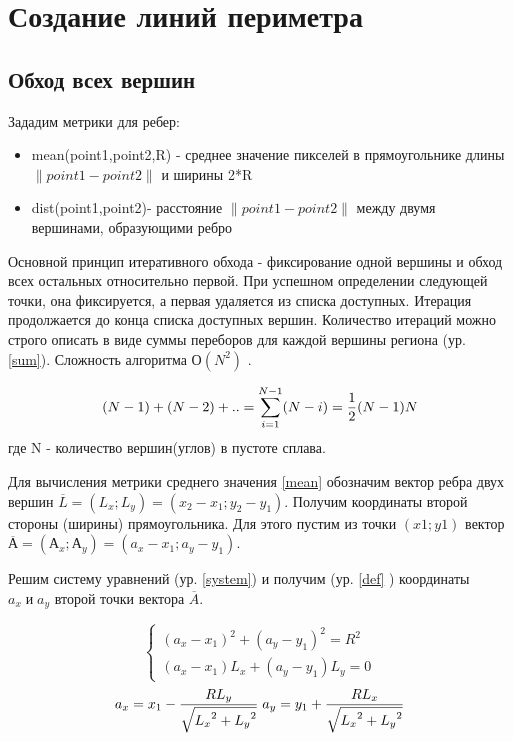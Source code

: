 \documentclass[a4paper, 14pt]{article}
\begin{document}
\section {Создание линий периметра}
\subsection{Обход всех вершин}
Зададим метрики для ребер:
\begin{itemize}
	\item mean(point1,point2,R) - среднее значение пикселей в прямоугольнике длины $\| point1-point2\|$ и ширины 2*R
		\label{mean}
	
	\item dist(point1,point2)- расстояние $\| point1-point2\|$ между двумя вершинами, образующими ребро
\end{itemize}

Основной принцип итеративного обхода - фиксирование одной вершины и обход всех остальных относительно первой. 
При успешном определении следующей точки, она фиксируется, а первая удаляется из списка доступных. Итерация продолжается до конца списка доступных вершин. Количество итераций можно строго описать  в виде суммы переборов для каждой вершины региона (ур. \ref{sum}). Сложность алгоритма $О(N^2)$ .

\begin{equation}
	\label{sum}
	(N-1)+(N-2)+..=\sum\limits_{i=1}^{N-1} (N-i)={1\over{2}}(N-1)N
\end{equation}
где N - количество вершин(углов) в пустоте сплава.

Для вычисления метрики среднего значения \ref{mean} обозначим вектор ребра двух вершин $\overline{L}=(L_x;L_y)=(x_2-x_1;y_2-y_1)$.
Получим координаты второй стороны (ширины) прямоугольника. Для этого пустим из точки $(x1;y1)$ вектор $\overline{А}=(А_x;А_y)=(a_x-x_1;a_y-y_1)$.

Решим систему уравнений (ур. \ref{system}) и получим (ур. \ref{def} ) координаты  $a_x\; и\; a_y$ второй точки вектора $\overline{A}$.


\begin{equation}
	\label{system}
	\begin{cases}
		(a_x-x_1)^2+(a_y-y_1)^2=R^2 
		\\
		(a_x-x_1)L_x+(a_y-y_1)L_y=0
	\end{cases}
\end{equation}
\begin{equation}
	\label{def}
		a_x=x_1-{{RL_y}\over{\sqrt{{L_x}^2+{L_y}^2}}}\;
		a_y=y_1+{{RL_x}\over{\sqrt{{L_x}^2+{L_y}^2}}}
\end{equation}
\end{document}
